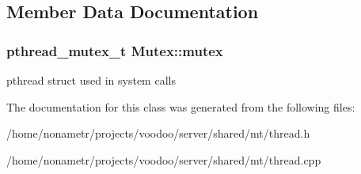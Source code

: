 \subsection{\-Member \-Data \-Documentation}
\hypertarget{classMutex_a8feb0b01916c1feedd1f0c0dcd74081b}{
\subsubsection[{mutex}]{\setlength{\rightskip}{0pt plus 5cm}pthread\-\_\-mutex\-\_\-t {\bf \-Mutex\-::mutex}}}\label{classMutex_a8feb0b01916c1feedd1f0c0dcd74081b}
pthread struct used in system calls 

\-The documentation for this class was generated from the following files\-:\begin{DoxyCompactItemize}
\item 
/home/nonametr/projects/voodoo/server/shared/mt/thread.\-h\item 
/home/nonametr/projects/voodoo/server/shared/mt/thread.\-cpp\end{DoxyCompactItemize}
